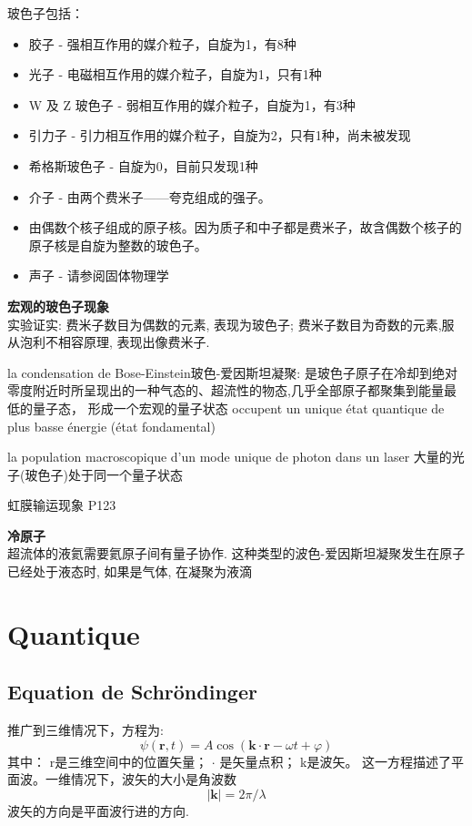 \documentclass[openany]{book}
\begin{document}
玻色子包括：
\begin{itemize}
\item 胶子 - 强相互作用的媒介粒子，自旋为1，有8种
\item 光子 - 电磁相互作用的媒介粒子，自旋为1，只有1种
\item W 及 Z 玻色子 - 弱相互作用的媒介粒子，自旋为1，有3种
\item 引力子 - 引力相互作用的媒介粒子，自旋为2，只有1种，尚未被发现
\item 希格斯玻色子 - 自旋为0，目前只发现1种
\item 介子 - 由两个费米子——夸克组成的强子。
\item 由偶数个核子组成的原子核。因为质子和中子都是费米子，故含偶数个核子的原子核是自旋为整数的玻色子。
\item 声子 - 请参阅固体物理学
\end{itemize}

\textbf{宏观的玻色子现象}\\
实验证实: 费米子数目为偶数的元素, 表现为玻色子; 费米子数目为奇数的元素,服从泡利不相容原理, 表现出像费米子.

la condensation de Bose-Einstein玻色-爱因斯坦凝聚: 是玻色子原子在冷却到绝对零度附近时所呈现出的一种气态的、超流性的物态,几乎全部原子都聚集到能量最低的量子态，
形成一个宏观的量子状态  occupent un unique \'etat quantique de plus basse \'energie (\'etat fondamental)

la population macroscopique d'un mode unique de photon dans un laser
大量的光子(玻色子)处于同一个量子状态

虹膜输运现象 P123

\textbf{冷原子}\\
超流体的液氦需要氦原子间有量子协作. 这种类型的波色-爱因斯坦凝聚发生在原子已经处于液态时, 如果是气体, 在凝聚为液滴

\chapter{Quantique}
\section{Equation de Schr\"ondinger}
推广到三维情况下，方程为:
$$
\psi \left({\mathbf r}, t \right) = A \cos \left({\mathbf k} \cdot {\mathbf r} - \omega t + \varphi \right)
$$
其中：
r是三维空间中的位置矢量；
$\cdot$ 是矢量点积；
k是波矢。
这一方程描述了平面波。一维情况下，波矢的大小是角波数
$$|{\mathbf k}| = 2\pi/\lambda$$
波矢的方向是平面波行进的方向.
\end{document}
